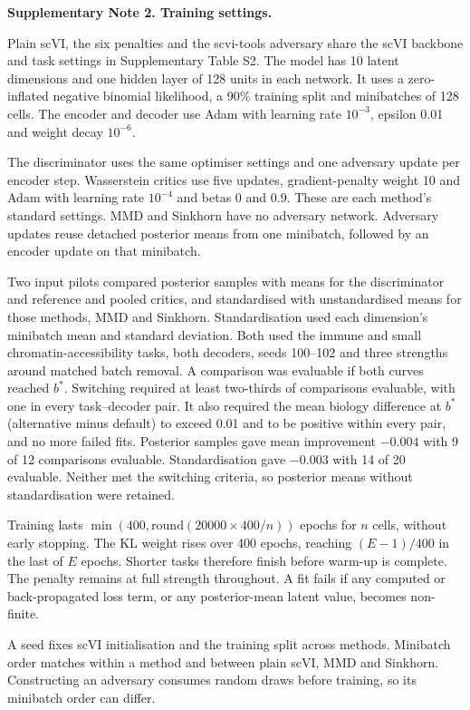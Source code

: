 \medskip\noindent\textbf{Supplementary Note 2. Training settings.}\par\smallskip
\begingroup\small\setlength{\parskip}{3pt}
Plain scVI, the six penalties and the scvi-tools adversary share the scVI backbone and task settings in Supplementary Table S2. The model has 10 latent dimensions and one hidden layer of 128 units in each network. It uses a zero-inflated negative binomial likelihood, a 90\% training split and minibatches of 128 cells. The encoder and decoder use Adam with learning rate $10^{-3}$, epsilon 0.01 and weight decay $10^{-6}$.

The discriminator uses the same optimiser settings and one adversary update per encoder step. Wasserstein critics use five updates, gradient-penalty weight 10 and Adam with learning rate $10^{-4}$ and betas 0 and 0.9. These are each method's standard settings. MMD and Sinkhorn have no adversary network. Adversary updates reuse detached posterior means from one minibatch, followed by an encoder update on that minibatch.

Two input pilots compared posterior samples with means for the discriminator and reference and pooled critics, and standardised with unstandardised means for those methods, MMD and Sinkhorn. Standardisation used each dimension's minibatch mean and standard deviation. Both used the immune and small chromatin-accessibility tasks, both decoders, seeds 100--102 and three strengths around matched batch removal. A comparison was evaluable if both curves reached $b^*$. Switching required at least two-thirds of comparisons evaluable, with one in every task--decoder pair. It also required the mean biology difference at $b^*$ (alternative minus default) to exceed 0.01 and to be positive within every pair, and no more failed fits. Posterior samples gave mean improvement $-0.004$ with 9 of 12 comparisons evaluable. Standardisation gave $-0.003$ with 14 of 20 evaluable. Neither met the switching criteria, so posterior means without standardisation were retained.

Training lasts $\min(400,\mathrm{round}(20000\times400/n))$ epochs for $n$ cells, without early stopping. The KL weight rises over 400 epochs, reaching $(E-1)/400$ in the last of $E$ epochs. Shorter tasks therefore finish before warm-up is complete. The penalty remains at full strength throughout. A fit fails if any computed or back-propagated loss term, or any posterior-mean latent value, becomes non-finite.

A seed fixes scVI initialisation and the training split across methods. Minibatch order matches within a method and between plain scVI, MMD and Sinkhorn. Constructing an adversary consumes random draws before training, so its minibatch order can differ.
\par\endgroup
